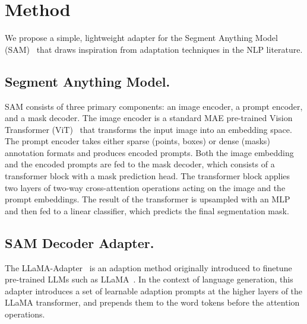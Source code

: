 \section{Method}
\label{sec:method}
We propose a simple, lightweight adapter for the Segment Anything Model (SAM)~ that draws inspiration from adaptation techniques in the NLP literature. 


\subsection{Segment Anything Model.}
\label{sec:sam}
SAM consists of three primary components: an image encoder, a prompt encoder, and a mask decoder. The image encoder is a standard MAE pre-trained Vision Transformer (ViT)~ that transforms the input image into an embedding space. The prompt encoder takes either sparse (points, boxes) or dense (masks) annotation formats and produces encoded prompts. Both the image embedding and the encoded prompts are fed to the mask decoder, which consists of a transformer block with a mask prediction head. The transformer block applies two layers of two-way cross-attention operations acting on the image and the prompt embeddings. The result of the transformer is upsampled with an MLP and then fed to a linear classifier, which predicts the final segmentation mask.

\subsection{SAM Decoder Adapter.}
\label{sec:adapter}

The LLaMA-Adapter~ is an adaption method originally introduced to finetune pre-trained LLMs such as LLaMA~. In the context of language generation, this adapter introduces a set of learnable adaption prompts at the higher layers of the LLaMA transformer, and prepends them to the word tokens before the attention operations. 

